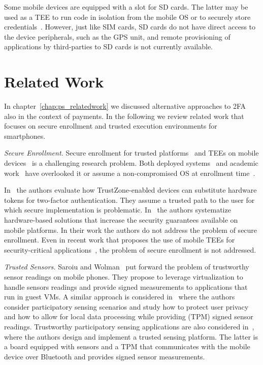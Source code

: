 Some mobile devices are equipped with a slot for SD cards. The latter may be
used as a TEE to run code in isolation from the mobile OS or to securely store
credentials~\cite{gdsdcard,smartSD}. However, just like SIM cards, SD cards do
not have direct access to the device peripherals, such as the GPS unit, and
remote provisioning of applications by third-parties to SD cards is not
currently available.

\section{Related Work}

In chapter~\ref{chap:ps_relatedwork} we discussed  alternative approaches to 2FA also in the context of payments. In the following we review related work that focuses on secure enrollment and trusted execution environments for smartphones.

\noindent\emph{Secure Enrollment.}
Secure enrollment for trusted platforms~\cite{parno_trust} and TEEs on mobile
devices~\cite{2013_spsm_marforio} is a challenging research problem. Both
deployed systems~\cite{barclays_pinsentry,google_authentication} and academic
work~\cite{park09acsac,liu12mobisys,gilbert11sensys} have overlooked it or
assume a non-compromised OS at enrollment time~\cite{czeskis12ccs,kari11stc}.

In~\cite{tz-secondfactor} the authors evaluate how TrustZone-enabled
devices can substitute hardware tokens for two-factor authentication. They
assume a trusted path to the user for which secure implementation is problematic.
In~\cite{vasudevan12trust} the authors systematize hardware-based
solutions that increase the security guarantees available on mobile
platforms. In their work the authors do not address the problem of secure
enrollment.
Even in recent work that proposes the use of mobile TEEs for security-critical applications~\cite{busold2013codaspy,dmitrienko2011trust,tamrakar2013trust}, 
the problem of secure enrollment is not addressed.

\noindent\emph{Trusted Sensors.}
Saroiu and Wolman~\cite{sariou10hotmobile} put forward the problem of
trustworthy sensor readings on mobile phones. They propose to leverage
virtualization to handle sensors readings and provide signed measurements to
applications that run in guest VMs.  A similar approach is considered
in~\cite{gilbert10hotmobile} where the authors consider participatory sensing
scenarios and study how to protect user privacy and how to allow for local data
processing while providing (TPM) signed sensor readings.  Trustworthy
participatory sensing applications are also considered in~\cite{dua10hotsec},
where the authors design and implement a trusted sensing platform. The latter is
a board equipped with sensors and a TPM that communicates with the mobile device
over Bluetooth and provides signed sensor measurements.

